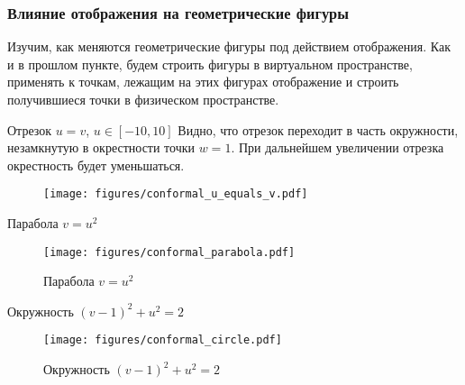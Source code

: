 \begin{frame}\frametitle{Влияние отображения на геометрические фигуры}
	Изучим, как меняются геометрические фигуры под действием отображения.
	Как и в прошлом пункте, будем строить фигуры в виртуальном пространстве,
	применять к точкам, лежащим на этих фигурах отображение и строить
	получившиеся точки в физическом пространстве.
\end{frame}

\begin{frame}{Отрезок \(u = v\), \(u \in [-10, 10]\)}
	Видно, что отрезок переходит в часть окружности, незамкнутую
	в окрестности точки \(w = 1\).
	При дальнейшем увеличении отрезка окрестность будет уменьшаться.
	\begin{figure}
		\centering
		\texttt{[image: figures/conformal\_u\_equals\_v.pdf]}
	\end{figure}
\end{frame}

\begin{frame}{Парабола \(v = u^2\)}
	\begin{figure}
		\centering
		\texttt{[image: figures/conformal\_parabola.pdf]}
		\caption{Парабола \(v=u^2\)}\label{fig:conformal_parabola}
	\end{figure}
\end{frame}

\begin{frame}{Окружность \((v-1)^2 + u^2 = 2\)}
	\begin{figure}
		\centering
		\texttt{[image: figures/conformal\_circle.pdf]}
		\caption{Окружность \((v-1)^2 + u^2 = 2\)}\label{fig:conformal_circle}
	\end{figure}
\end{frame}
